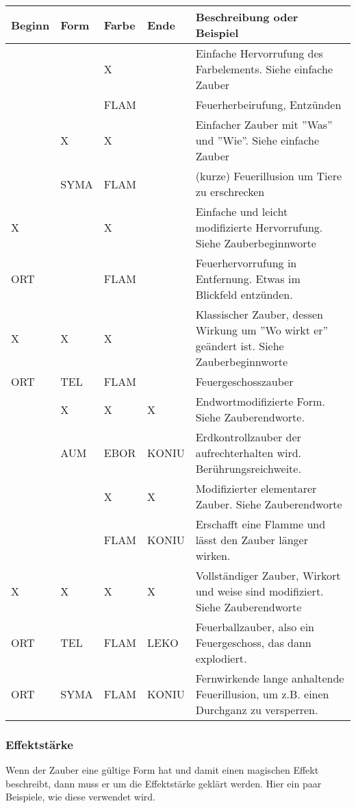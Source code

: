\documentclass{article}
\begin{document}
\begin{small}
\begin{tabular}{|m{1.3cm}|m{1.3cm}|m{1.3cm}|m{1.3cm}|m{8cm}|}
\hline
\textbf{Beginn}&\textbf{Form}&\textbf{Farbe}&\textbf{Ende}&\textbf{Beschreibung oder Beispiel}\\
\hline
\hline
&&X&&Einfache Hervorrufung des Farbelements. Siehe einfache Zauber\\
\hline
&&FLAM&&Feuerherbeirufung, Entzünden\\
\hline
&X&X&&Einfacher Zauber mit ''Was'' und ''Wie''. Siehe einfache Zauber\\
\hline
&SYMA&FLAM&&(kurze) Feuerillusion um Tiere zu erschrecken\\
\hline
X&&X&&Einfache und leicht modifizierte Hervorrufung. Siehe Zauberbeginnworte\\
\hline
ORT&&FLAM&&Feuerhervorrufung in Entfernung. Etwas im Blickfeld entzünden.\\
\hline
X&X&X&&Klassischer Zauber, dessen Wirkung um ''Wo wirkt er'' geändert ist. Siehe Zauberbeginnworte\\
\hline
ORT&TEL&FLAM&&Feuergeschosszauber\\
\hline
&X&X&X&Endwortmodifizierte Form. Siehe Zauberendworte.\\
\hline
&AUM&EBOR&KONIU&Erdkontrollzauber der aufrechterhalten wird. Berührungsreichweite.\\
\hline
&&X&X&Modifizierter elementarer Zauber. Siehe Zauberendworte\\
\hline
&&FLAM&KONIU&Erschafft eine Flamme und lässt den Zauber länger wirken.\\
\hline
X&X&X&X&Vollständiger Zauber, Wirkort und weise sind modifiziert. Siehe Zauberendworte\\
\hline
ORT&TEL&FLAM&LEKO&Feuerballzauber, also ein Feuergeschoss, das dann explodiert.\\
\hline
ORT&SYMA&FLAM&KONIU&Fernwirkende lange anhaltende Feuerillusion, um z.B. einen Durchganz zu versperren.\\
\hline
\end{tabular}
\end{small}

\subsubsection{Effektstärke}

Wenn der Zauber eine gültige Form hat und damit einen magischen Effekt beschreibt, dann muss er um die Effektstärke
geklärt werden. Hier ein paar Beispiele, wie diese verwendet wird.
\end{document}
